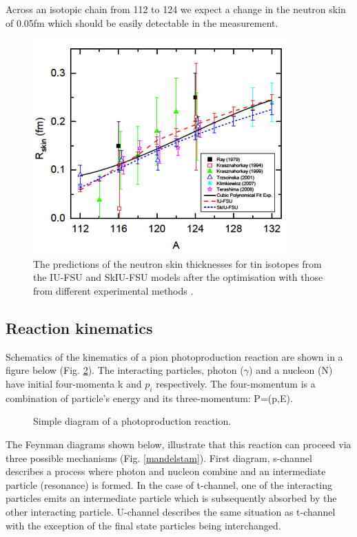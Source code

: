 \indent Across an isotopic chain from 112 to 124 we expect a change in the neutron skin of 0.05fm which should be easily detectable in the measurement.

\begin{figure}[H]
\begin{center}
\includegraphics[scale=0.6]{pictures/png/tiniso.png}
\caption{The predictions of the neutron skin thicknesses for tin isotopes from the IU-FSU and SkIU-FSU models after the optimisation with those from different experimental methods \cite{fattoyev}.}
\label{tiniso}
\end{center}
\end{figure}

\subsection{Reaction kinematics}

\indent Schematics of the kinematics of a pion photoproduction reaction are shown in a figure below (Fig. \ref{photorea}). The interacting particles, photon ($\gamma$) and a nucleon (N) have initial four-momenta k and $p_{i}$ respectively. The four-momentum is a combination of particle's energy and its three-momentum: P=(p,E).

\begin{figure}[H]
\begin{center}
\caption{Simple diagram of a photoproduction reaction.}
\label{photorea}
\end{center}
\end{figure}

\indent The Feynman diagrams shown below, illustrate that this reaction can proceed via three possible mechanisms (Fig. \ref{mandelstam}). First diagram, s-channel describes a process where photon and nucleon combine and an intermediate particle (resonance) is formed. In the case of t-channel, one of the interacting particles emits an intermediate particle which is subsequently absorbed by the other interacting particle. U-channel describes the same situation as t-channel with the exception of the final state particles being interchanged.

